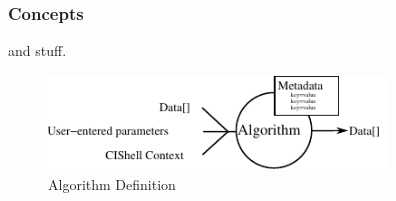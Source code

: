 \subsubsection{Concepts}

 and stuff.

\begin{figure}[htb!]
\centering
\includegraphics[width=90mm]{../img/algorithmDefn.pdf}
\caption{Algorithm Definition}
\label{fig:algorithmDefn}
\end{figure}

